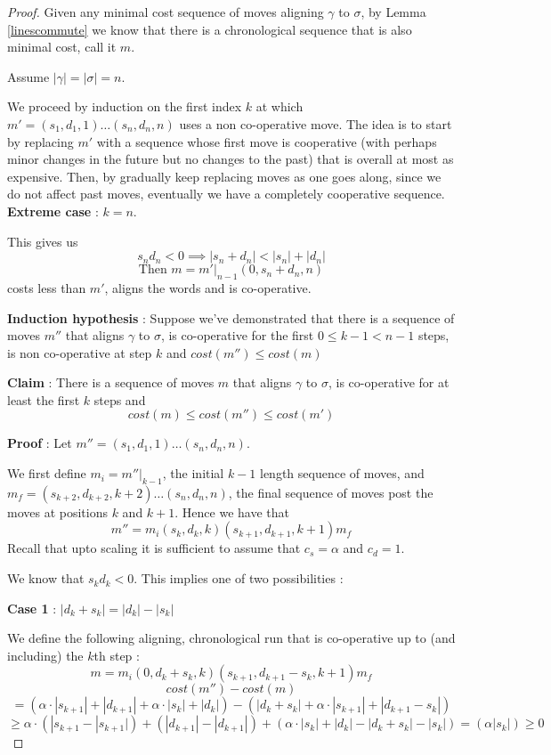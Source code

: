 \documentclass[runningheads]{llncs}
\begin{document}
\begin{proof}
Given any minimal cost sequence of moves aligning $\gamma$ to $\sigma$, by Lemma \ref{linescommute} we know that there is a chronological sequence that is also minimal cost, call it $m$. 

Assume $|\gamma| = |\sigma| = n$. 

We proceed by induction on the first index $k$ at which $m' = (s_1, d_1, 1)\dots(s_n, d_n, n)$ uses a non co-operative move. 
The idea is to start by replacing $m'$ with a sequence whose first move is cooperative (with perhaps minor changes in the future but no changes to the past) that is overall at most as expensive. 
Then, by gradually keep replacing moves as one goes along, since we do not affect past moves, eventually we have a completely cooperative sequence. 
\textbf{Extreme case} : $k = n$.

This gives us $$s_n d_n < 0 \implies |s_n + d_n| < |s_n| + |d_n|$$ 
$$\textrm{Then } m = m'|_{n-1}(0, s_n + d_n, n)$$ costs less than $m'$, aligns the words and is co-operative. 

\textbf{Induction hypothesis} : Suppose we've demonstrated that there is a sequence of moves $m''$ that aligns $\gamma$ to $\sigma$, is co-operative for the first $0 \leq k-1 < n-1$ steps, is non co-operative at step $k$ and $cost(m'') \leq cost(m)$

\textbf{Claim} : There is a sequence of moves $m$ that aligns $\gamma$ to $\sigma$, is co-operative for at least the first $k$ steps and $$cost(m) \leq cost(m'') \leq cost(m')$$

\textbf{Proof} : Let $m'' = (s_1, d_1, 1)\dots(s_n, d_n, n)$. 

We first define $m_i = m''|_{k-1}$, the initial $k-1$ length sequence of moves, and $m_f = (s_{k+2}, d_{k+2}, k+2)\dots (s_n, d_n, n)$, the final sequence of moves post the moves at positions $k$ and $k+1$. 
Hence we have that $$m'' = m_i(s_k, d_k, k)(s_{k+1}, d_{k+1}, k+1)m_f$$
Recall that upto scaling it is sufficient to assume that $c_s = \alpha$ and $c_d = 1$. 

We know that $s_kd_k < 0$. 
This implies one of two possibilities : 

\textbf{Case 1} : $|d_k + s_k| = |d_k| - |s_k|$

We define the following aligning, chronological run that is co-operative up to (and including) the $k$th step : 
$$m = m_i( 0, d_k + s_k, k)( s_{k+1}, d_{k+1} - s_k, k+1)m_f$$
$$cost(m'') - cost(m)  $$$$ = (\alpha \cdot |s_{k+1}| + |d_{k+1}| + \alpha \cdot |s_k| + |d_k|) - ( | d_k + s_k| + \alpha \cdot | s_{k+1}| + | d_{k+1} - s_k |) $$ 
$$\geq \alpha \cdot (|s_{k+1} - |s_{k+1}|) + (|d_{k+1}| - |d_{k+1}|)+ (\alpha \cdot|s_k| + |d_k|  -| d_k + s_k|  - |s_k |) = (\alpha |s_k|)  \geq 0$$


\end{proof}
\end{document}
